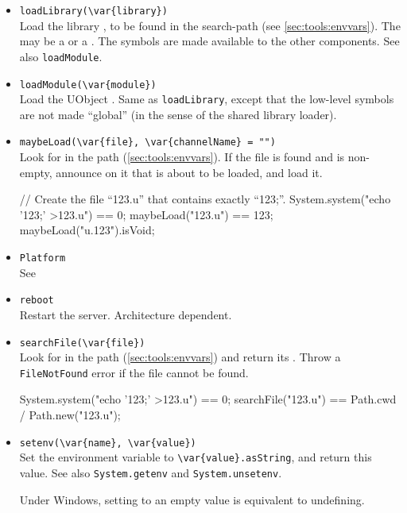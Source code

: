 \begin{itemize}
\item \lstinline|loadLibrary(\var{library})|\\
  Load the library , to be found in the
   search-path (see
  \autoref{sec:tools:envvars}).  The  may be a
   or a .  The \Cxx symbols are made
  available to the other \Cxx components.  See also
  \lstinline|loadModule|.

\item \lstinline|loadModule(\var{module})|\\
  Load the UObject .  Same as \lstinline|loadLibrary|,
  except that the low-level \Cxx symbols are not made ``global'' (in
  the sense of the shared library loader).

\item \lstinline|maybeLoad(\var{file}, \var{channelName} = "")|\\
  Look for  in the \urbi path
  (\autoref{sec:tools:envvars}).  If the file is found and
   is non-empty, announce on it that  is
  about to be loaded, and load it.

\begin{urbiassert}[firstnumber=last]
// Create the file ``123.u'' that contains exactly ``123;''.
System.system("echo '123;' >123.u") == 0;
maybeLoad("123.u") == 123;
maybeLoad("u.123").isVoid;
\end{urbiassert}

\item \lstinline|Platform|\\
  See 

\item \lstinline|reboot|\\
  Restart the \urbi server.  Architecture dependent.

\item \lstinline|searchFile(\var{file})|\\
  Look for  in the \urbi path (\autoref{sec:tools:envvars})
  and return its .  Throw a \lstinline|FileNotFound|
  error if the file cannot be found.
\begin{urbiassert}[firstnumber=last]
System.system("echo '123;' >123.u") == 0;
searchFile("123.u") == Path.cwd / Path.new("123.u");
\end{urbiassert}

\item \lstinline|setenv(\var{name}, \var{value})|\\
  Set the environment variable  to
  \lstinline|\var{value}.asString|, and return this value.  See also
  \lstinline|System.getenv| and \lstinline|System.unsetenv|.
  \begin{windows}
    Under Windows, setting to an empty value is equivalent to
    undefining.
  \end{windows}


\end{itemize}
